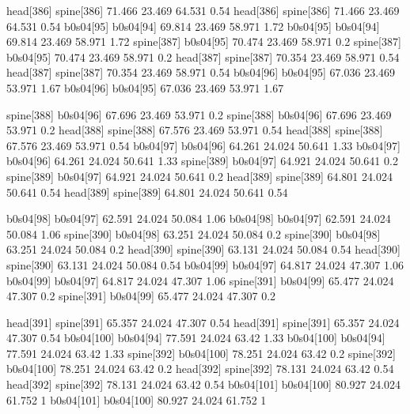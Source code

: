 head[386]    spine[386]    71.466    23.469    64.531    0.54
head[386]    spine[386]    71.466    23.469    64.531    0.54
b0s04[95]    b0s04[94]    69.814    23.469    58.971    1.72
b0s04[95]    b0s04[94]    69.814    23.469    58.971    1.72
spine[387]    b0s04[95]    70.474    23.469    58.971    0.2
spine[387]    b0s04[95]    70.474    23.469    58.971    0.2
head[387]    spine[387]    70.354    23.469    58.971    0.54
head[387]    spine[387]    70.354    23.469    58.971    0.54
b0s04[96]    b0s04[95]    67.036    23.469    53.971    1.67
b0s04[96]    b0s04[95]    67.036    23.469    53.971    1.67


spine[388]    b0s04[96]    67.696    23.469    53.971    0.2
spine[388]    b0s04[96]    67.696    23.469    53.971    0.2
head[388]    spine[388]    67.576    23.469    53.971    0.54
head[388]    spine[388]    67.576    23.469    53.971    0.54
b0s04[97]    b0s04[96]    64.261    24.024    50.641    1.33
b0s04[97]    b0s04[96]    64.261    24.024    50.641    1.33
spine[389]    b0s04[97]    64.921    24.024    50.641    0.2
spine[389]    b0s04[97]    64.921    24.024    50.641    0.2
head[389]    spine[389]    64.801    24.024    50.641    0.54
head[389]    spine[389]    64.801    24.024    50.641    0.54


b0s04[98]    b0s04[97]    62.591    24.024    50.084    1.06
b0s04[98]    b0s04[97]    62.591    24.024    50.084    1.06
spine[390]    b0s04[98]    63.251    24.024    50.084    0.2
spine[390]    b0s04[98]    63.251    24.024    50.084    0.2
head[390]    spine[390]    63.131    24.024    50.084    0.54
head[390]    spine[390]    63.131    24.024    50.084    0.54
b0s04[99]    b0s04[97]    64.817    24.024    47.307    1.06
b0s04[99]    b0s04[97]    64.817    24.024    47.307    1.06
spine[391]    b0s04[99]    65.477    24.024    47.307    0.2
spine[391]    b0s04[99]    65.477    24.024    47.307    0.2


head[391]    spine[391]    65.357    24.024    47.307    0.54
head[391]    spine[391]    65.357    24.024    47.307    0.54
b0s04[100]    b0s04[94]    77.591    24.024    63.42    1.33
b0s04[100]    b0s04[94]    77.591    24.024    63.42    1.33
spine[392]    b0s04[100]    78.251    24.024    63.42    0.2
spine[392]    b0s04[100]    78.251    24.024    63.42    0.2
head[392]    spine[392]    78.131    24.024    63.42    0.54
head[392]    spine[392]    78.131    24.024    63.42    0.54
b0s04[101]    b0s04[100]    80.927    24.024    61.752    1
b0s04[101]    b0s04[100]    80.927    24.024    61.752    1


